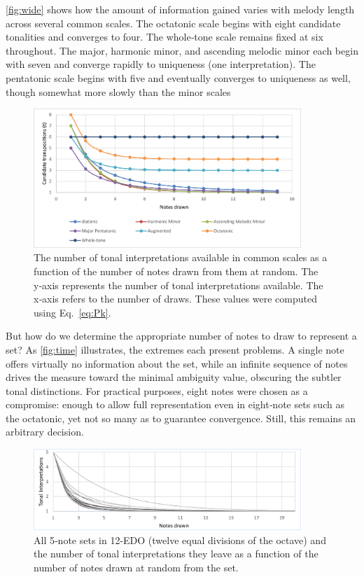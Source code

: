 \documentclass[10pt,twocolumn]{article}
\numberwithin{equation}{section} %
\begin{document}
    \autoref{fig:wide} shows how the amount of information gained varies with melody length across several common scales.
    The octatonic scale begins with eight candidate tonalities and converges to four.
    The whole‑tone scale remains fixed at six throughout.
    The major, harmonic minor, and ascending melodic minor each begin with seven and converge rapidly to uniqueness (one interpretation).
    The pentatonic scale begins with five and eventually converges to uniqueness as well, though somewhat more slowly than the minor scales

    \begin{figure}[htbp]
        \centering
        \includegraphics[width=0.9\textwidth]{transposition-probability.pdf}%
        \caption{The number of tonal interpretations available in common scales as a function of the number of notes drawn from them at random.
        The y‑axis represents the number of tonal interpretations available.
        The x‑axis refers to the number of draws.
        These values were computed using Eq.~\ref{eq:Pk}.}
        \label{fig:wide}
    \end{figure}

    But how do we determine the appropriate number of notes to draw to represent a set?
    As \autoref{fig:time} illustrates, the extremes each present problems.
    A single note offers virtually no information about the set, while an infinite sequence of notes drives the measure toward the minimal ambiguity value, obscuring the subtler tonal distinctions.
    For practical purposes, eight notes were chosen as a compromise: enough to allow full representation even in eight‑note sets such as the octatonic, yet not so many as to guarantee convergence.
    Still, this remains an arbitrary decision.

    \begin{figure}[htbp]
        \centering
        \includegraphics[width=0.9\textwidth]{transposition-time.pdf}%
        \caption{All 5‑note sets in 12-EDO (twelve equal divisions of the octave) and the number of tonal interpretations they leave as a function of the number of notes drawn at random from the set.}
        \label{fig:time}
    \end{figure}
\end{document}
